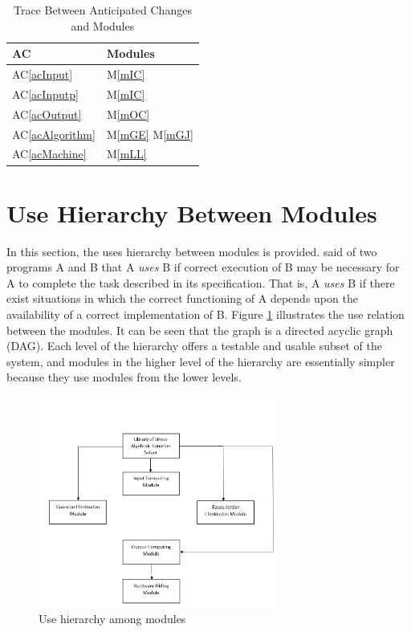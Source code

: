 \documentclass[12pt, titlepage]{article}
\newcommand{\acref}[1]{AC\ref{#1}}
\newcommand{\mref}[1]{M\ref{#1}}
\begin{document}
\begin{table}[H]
\centering
\begin{tabular}{p{} p{}}
\toprule
\textbf{AC} & \textbf{Modules}\\
\midrule
\acref{acInput} & \mref{mIC}\\
\acref{acInputp} & \mref{mIC}\\
\acref{acOutput} & \mref{mOC}\\
\acref{acAlgorithm} & \mref{mGE} \mref{mGJ}\\
\acref{acMachine} & \mref{mLL}\\

\bottomrule
\end{tabular}
\caption{Trace Between Anticipated Changes and Modules}
\label{TblACT}
\end{table}

\section{Use Hierarchy Between Modules} \label{SecUse}

In this section, the uses hierarchy between modules is
provided. \citet{Parnas1978} said of two programs A and B that A {\em uses} B if
correct execution of B may be necessary for A to complete the task described in
its specification. That is, A {\em uses} B if there exist situations in which
the correct functioning of A depends upon the availability of a correct
implementation of B.  Figure \ref{FigUH} illustrates the use relation between
the modules. It can be seen that the graph is a directed acyclic graph
(DAG). Each level of the hierarchy offers a testable and usable subset of the
system, and modules in the higher level of the hierarchy are essentially simpler
because they use modules from the lower levels.

\begin{figure}[H]
\centering
\includegraphics[width=0.7\textwidth]{UsesHierarchy.PNG}
\caption{Use hierarchy among modules}
\label{FigUH}
\end{figure}
\end{document}
